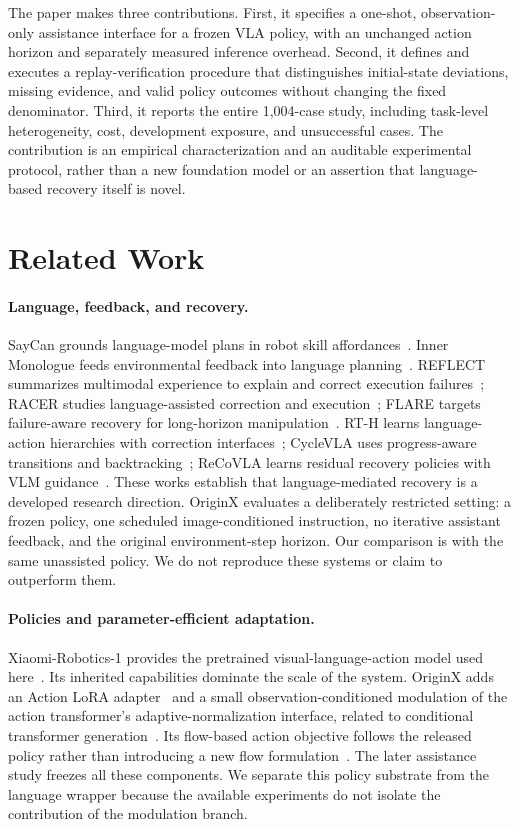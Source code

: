 \documentclass[10pt,twocolumn,letterpaper]{article}
\begin{document}
The paper makes three contributions. First, it specifies a one-shot, observation-only assistance interface for a frozen VLA policy, with an unchanged action horizon and separately measured inference overhead. Second, it defines and executes a replay-verification procedure that distinguishes initial-state deviations, missing evidence, and valid policy outcomes without changing the fixed denominator. Third, it reports the entire 1,004-case study, including task-level heterogeneity, cost, development exposure, and unsuccessful cases. The contribution is an empirical characterization and an auditable experimental protocol, rather than a new foundation model or an assertion that language-based recovery itself is novel.



\section{Related Work}
\label{sec:related}
\paragraph{Language, feedback, and recovery.}
SayCan grounds language-model plans in robot skill affordances~\cite{saycan}. Inner Monologue feeds environmental feedback into language planning~\cite{innermonologue}. REFLECT summarizes multimodal experience to explain and correct execution failures~\cite{reflect}; RACER studies language-assisted correction and execution~\cite{racer}; FLARE targets failure-aware recovery for long-horizon manipulation~\cite{flare}. RT-H learns language-action hierarchies with correction interfaces~\cite{rth}; CycleVLA uses progress-aware transitions and backtracking~\cite{cyclevla}; ReCoVLA learns residual recovery policies with VLM guidance~\cite{recovla}. These works establish that language-mediated recovery is a developed research direction. OriginX evaluates a deliberately restricted setting: a frozen policy, one scheduled image-conditioned instruction, no iterative assistant feedback, and the original environment-step horizon. Our comparison is with the same unassisted policy. We do not reproduce these systems or claim to outperform them.

\paragraph{Policies and parameter-efficient adaptation.}
Xiaomi-Robotics-1 provides the pretrained visual-language-action model used here~\cite{xiaomi}. Its inherited capabilities dominate the scale of the system. OriginX adds an Action LoRA adapter~\cite{lora} and a small observation-conditioned modulation of the action transformer's adaptive-normalization interface, related to conditional transformer generation~\cite{dit}. Its flow-based action objective follows the released policy rather than introducing a new flow formulation~\cite{flow}. The later assistance study freezes all these components. We separate this policy substrate from the language wrapper because the available experiments do not isolate the contribution of the modulation branch.
\end{document}
